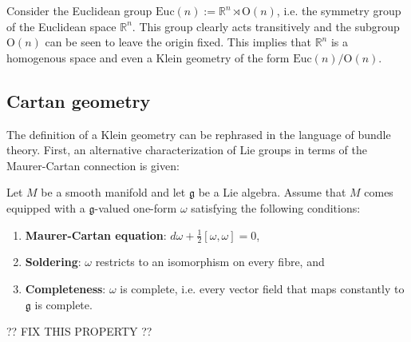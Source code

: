     \begin{example}
        Consider the Euclidean group $\mathrm{Euc}(n):=\mathbb{R}^n\rtimes\mathrm{O}(n)$, i.e. the symmetry group of the Euclidean space $\mathbb{R}^n$. This group clearly acts transitively and the subgroup $\mathrm{O}(n)$ can be seen to leave the origin fixed. This implies that $\mathbb{R}^n$ is a homogenous space and even a Klein geometry of the form $\mathrm{Euc}(n)/\mathrm{O}(n)$.
    \end{example}


\subsection{Cartan geometry}

    The definition of a Klein geometry can be rephrased in the language of bundle theory. First, an alternative characterization of Lie groups in terms of the Maurer-Cartan connection is given:
    \begin{adefinition}
        Let $M$ be a smooth manifold and let $\mathfrak{g}$ be a Lie algebra. Assume that $M$ comes equipped with a $\mathfrak{g}$-valued one-form $\omega$ satisfying the following conditions:
        \begin{enumerate}
            \item\textbf{Maurer-Cartan equation}: $d\omega + \frac{1}{2}[\omega,\omega]=0$,
            \item\textbf{Soldering}: $\omega$ restricts to an isomorphism on every fibre, and
            \item\textbf{Completeness}: $\omega$ is complete, i.e. every vector field that maps constantly to $\mathfrak{g}$ is complete.
        \end{enumerate}

        ?? FIX THIS PROPERTY ??
    \end{adefinition}

